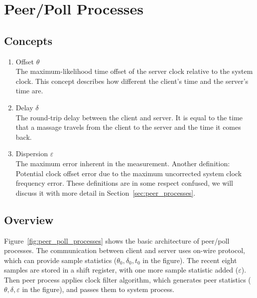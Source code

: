 \chapter{Peer/Poll Processes}
\label{cha:peer/poll}

\section{Concepts}%
\label{sec:peer/poll_concepts}
\begin{enumerate}
    \item Offset $\theta$\\
        The maximum-likelihood time offset of the server clock relative to the
        system clock. This concept describes how different the client's time
        and the server's time are.
    \item Delay $\delta$\\
        The round-trip delay between the client and server. It is equal to the
        time that a massage travels from the client to the server and the time
        it comes back.
    \item Dispersion $\varepsilon$\\
        The maximum error inherent in the measurement.
        Another definition: Potential clock offset error due to the maximum
        uncorrected system clock frequency error.
        These definitions are in some respect confused, we will discuss it with
        more detail in Section~\ref{sec:peer_processes}.
\end{enumerate}

\section{Overview}%
\label{sec:overview}
Figure~\ref{fig:peer_poll_processes} shows the basic architecture of peer/poll
processes. The communication between client and server uses on-wire protocol,
which can provide sample statistics ($\theta_0, \delta_0, t_0$ in the figure).
The recent eight samples are stored in a shift register, with one more sample
statistic added ($\varepsilon$).  Then peer process applies clock filter
algorithm, which generates peer statistics ($\theta, \delta, \varepsilon$ in
the figure), and passes them to system process.

